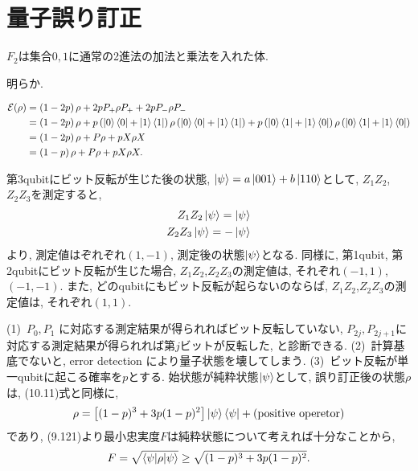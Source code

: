 \chapter{量子誤り訂正}
$F_2$は集合${0,1}$に通常の2進法の加法と乗法を入れた体.
\begin{ex}
    \label{ex10.1}
    明らか.
\end{ex}


\begin{ex}
    \label{ex10.2}
    \begin{align*}
        \mathcal{E}(\rho)
         & =
        \left( 1 - 2p\right) \rho + 2 p P_{+} \rho P_{+} + 2p P_{-} \rho P_{-} \\
         & =
        \left( 1 - 2p\right) \rho + p\left( \ket{0}\bra{0} + \ket{1}\bra{1} \right)\rho
        \left( \ket{0}\bra{0} + \ket{1}\bra{1} \right)
        + p \left( \ket{0}\bra{1} +  \ket{1}\bra{0} \right)\rho
        \left( \ket{0}\bra{1} + \ket{1}\bra{0}\right)                          \\
         & =
        \left( 1 - 2p\right) \rho  + P \rho + p X \rho X
        \\
         & =
        \left( 1 - p\right) \rho  + P \rho + p X \rho X.
    \end{align*}
\end{ex}

\begin{ex}
    \label{ex10.3}
    第3qubitにビット反転が生じた後の状態, $\ket{\psi}=a\ket{001}+b\ket{110}$として,
    $Z_1 Z_2$, $Z_2 Z_3$を測定すると,
    \begin{align*}
        Z_1 Z_2 \ket{\psi} = \ket{\psi} \\
        Z_2 Z_3 \ket{\psi} = - \ket{\psi}
    \end{align*}
    より, 測定値はぞれぞれ$(1, -1)$, 測定後の状態$\ket{\psi}$となる. 同様に, 第1qubit, 第2qubitにビット反転が生じた場合, $Z_1 Z_2$,$Z_2 Z_3$の測定値は, それぞれ$(-1, 1)$, $(-1, -1)$. また, どのqubitにもビット反転が起らないのならば, $Z_1 Z_2$,$Z_2 Z_3$の測定値は, それぞれ$(1, 1)$.
\end{ex}

\begin{ex}
    \label{ex10.4}
    (1)\
    $P_0, P_1$ に対応する測定結果が得られればビット反転していない, $P_{2j}, P_{2j+1}$に対応する測定結果が得られれば第$j$ビットが反転した, と診断できる.
    (2)\
    計算基底でないと, error detection により量子状態を壊してしまう.
    (3)\
    ビット反転が単一qubitに起こる確率を$p$とする. 始状態が純粋状態$\ket{\psi}$として, 誤り訂正後の状態$\rho$は, (10.11)式と同様に,
    \begin{align*}
        \rho = \left[ (1-p)^3 + 3p(1-p)^2\right]\ket{\psi}\bra{\psi} + \left(\mathrm{positive \ operetor}\right)
    \end{align*}
    であり, (9.121)より最小忠実度$F$は純粋状態について考えれば十分なことから,
    \begin{align*}
        F = \sqrt{\braket{\psi| \rho | \psi}} \geq \sqrt{(1-p)^3 + 3p(1-p)^2}.
    \end{align*}
\end{ex}

